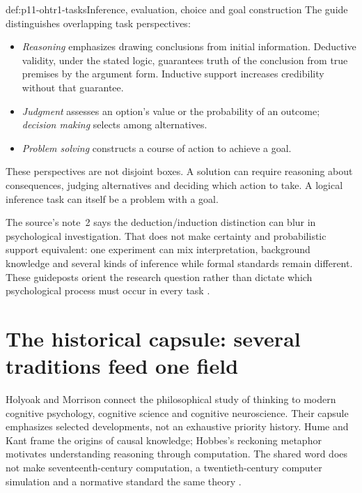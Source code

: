 \begin{hbdefinition}{def:p11-ohtr1-tasks}{Inference, evaluation, choice and goal construction}
The guide distinguishes overlapping task perspectives:
\begin{itemize}
\item \emph{Reasoning} emphasizes drawing conclusions from initial
      information. Deductive validity, under the stated logic, guarantees
      truth of the conclusion from true premises by the argument form.
      Inductive support increases credibility without that guarantee.
\item \emph{Judgment} assesses an option's value or the probability of an
      outcome; \emph{decision making} selects among alternatives.
\item \emph{Problem solving} constructs a course of action to achieve a goal.
\end{itemize}
These perspectives are not disjoint boxes. A solution can require reasoning
about consequences, judging alternatives and deciding which action to take.
A logical inference task can itself be a problem with a goal.
\end{hbdefinition}

The source's note~2 says the deduction/induction distinction can blur in
psychological investigation. That does not make certainty and probabilistic
support equivalent: one experiment can mix interpretation, background
knowledge and several kinds of inference while formal standards remain
different. These guideposts orient the research question rather than dictate
which psychological process must occur in every task
\parencite[pp.~2--3, note~2 on p.~7]{HolyoakMorrison2012ReadersGuide}.

\section{The historical capsule: several traditions feed one field}
\label{sec:p11-ohtr1-history}

Holyoak and Morrison connect the philosophical study of thinking to modern
cognitive psychology, cognitive science and cognitive neuroscience. Their
capsule emphasizes selected developments, not an exhaustive priority history.
Hume and Kant frame the origins of causal knowledge; Hobbes's reckoning
metaphor motivates understanding reasoning through computation. The shared
word does not make seventeenth-century computation, a twentieth-century
computer simulation and a normative standard the same theory
\parencite[p.~3, note~3 on p.~7]{HolyoakMorrison2012ReadersGuide}.

